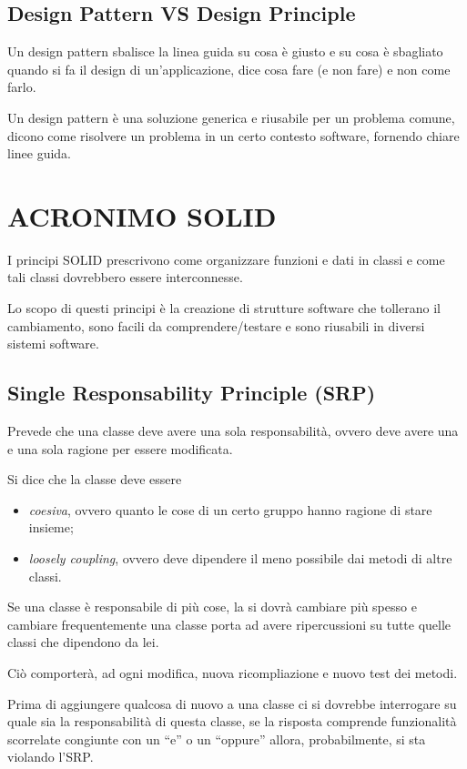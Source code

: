 \section{Design Pattern VS Design Principle}

Un design pattern sbalisce la linea guida su cosa è giusto e su cosa è sbagliato quando si fa il design di un’applicazione, dice cosa fare (e non fare) e non come farlo.

Un design pattern è una soluzione generica e riusabile per un problema comune, dicono come risolvere un problema in un certo contesto software, fornendo chiare linee guida.

\chapter{ACRONIMO SOLID}

I principi SOLID prescrivono come organizzare funzioni e dati in classi e come tali classi dovrebbero essere interconnesse.

Lo scopo di questi principi è la creazione di strutture software che tollerano il cambiamento, sono facili da comprendere/testare e sono riusabili in diversi sistemi software.

\section{Single Responsability Principle (SRP)}

Prevede che una classe deve avere una sola responsabilità, ovvero deve avere una e una sola ragione per essere modificata.

Si dice che la classe deve essere 

\begin{itemize}
  \item \textit{coesiva}, ovvero quanto le cose di un certo gruppo hanno ragione di stare insieme;
  \item \textit{loosely coupling}, ovvero deve dipendere il meno possibile dai metodi di altre classi.
\end{itemize}

Se una classe è responsabile di più cose, la si dovrà cambiare più spesso e cambiare frequentemente una classe porta ad avere ripercussioni su tutte quelle classi che dipendono da lei.

Ciò comporterà, ad ogni modifica, nuova ricompliazione e nuovo test dei metodi.

Prima di aggiungere qualcosa di nuovo a una classe ci si dovrebbe interrogare su quale sia la responsabilità di questa classe, se la risposta comprende funzionalità scorrelate congiunte
con un “e” o un “oppure” allora, probabilmente, si sta violando l’SRP.


